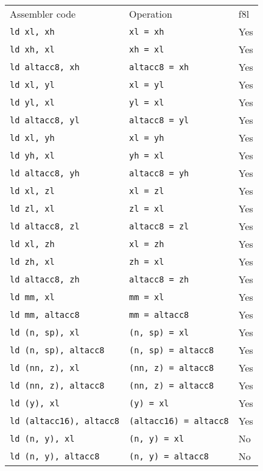 \documentclass{book}
\begin{document}
\begin{tabular}{l l l}
Assembler code                  & Operation                     & f8l \\
\texttt{ld xl, xh}              & \texttt{xl = xh}              & Yes \\
\texttt{ld xh, xl}              & \texttt{xh = xl}              & Yes \\
\texttt{ld altacc8, xh}         & \texttt{altacc8 = xh}         & Yes \\
\texttt{ld xl, yl}              & \texttt{xl = yl}              & Yes \\
\texttt{ld yl, xl}              & \texttt{yl = xl}              & Yes \\
\texttt{ld altacc8, yl}         & \texttt{altacc8 = yl}         & Yes \\
\texttt{ld xl, yh}              & \texttt{xl = yh}              & Yes \\
\texttt{ld yh, xl}              & \texttt{yh = xl}              & Yes \\
\texttt{ld altacc8, yh}         & \texttt{altacc8 = yh}         & Yes \\
\texttt{ld xl, zl}              & \texttt{xl = zl}              & Yes \\
\texttt{ld zl, xl}              & \texttt{zl = xl}              & Yes \\
\texttt{ld altacc8, zl}         & \texttt{altacc8 = zl}         & Yes \\
\texttt{ld xl, zh}              & \texttt{xl = zh}              & Yes \\
\texttt{ld zh, xl}              & \texttt{zh = xl}              & Yes \\
\texttt{ld altacc8, zh}         & \texttt{altacc8 = zh}         & Yes \\
\texttt{ld mm, xl}              & \texttt{mm = xl}              & Yes \\
\texttt{ld mm, altacc8}         & \texttt{mm = altacc8}         & Yes \\
\texttt{ld (n, sp), xl}         & \texttt{(n, sp) = xl}         & Yes \\
\texttt{ld (n, sp), altacc8}    & \texttt{(n, sp) = altacc8}    & Yes \\
\texttt{ld (nn, z), xl}         & \texttt{(nn, z) = altacc8}    & Yes \\
\texttt{ld (nn, z), altacc8}    & \texttt{(nn, z) = altacc8}    & Yes \\
\texttt{ld (y), xl}             & \texttt{(y) = xl}             & Yes \\
\texttt{ld (altacc16), altacc8} & \texttt{(altacc16) = altacc8} & Yes \\
\texttt{ld (n, y), xl}          & \texttt{(n, y) = xl}          & No \\
\texttt{ld (n, y), altacc8}     & \texttt{(n, y) = altacc8}     & No \\
\end{tabular}
\end{document}
